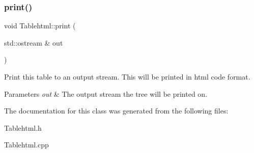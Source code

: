 \subsubsection{\texorpdfstring{print()}{print()}}
{\footnotesize\ttfamily void Tablehtml\+::print (\begin{DoxyParamCaption}\item[{std\+::ostream \&}]{out }\end{DoxyParamCaption})}

Print this table to an output stream. This will be printed in html code format. 
\begin{DoxyParams}{Parameters}
{\em out} & The output stream the tree will be printed on. \\
\hline
\end{DoxyParams}


The documentation for this class was generated from the following files\+:\begin{DoxyCompactItemize}
\item 
Tablehtml.\+h\item 
Tablehtml.\+cpp\end{DoxyCompactItemize}
